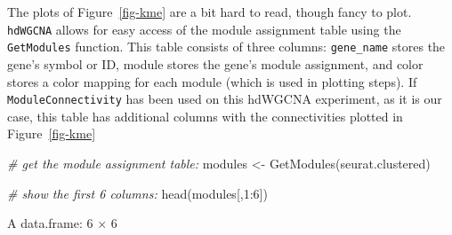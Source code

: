 \documentclass[
  letterpaper,
  DIV=11,
  numbers=noendperiod]{scrartcl}
\newenvironment{Shaded}{}{}
\newcommand{\CommentTok}[1]{\textcolor[rgb]{0.38,0.63,0.69}{\textit{#1}}}
\newcommand{\DecValTok}[1]{\textcolor[rgb]{0.25,0.63,0.44}{#1}}
\newcommand{\FunctionTok}[1]{\textcolor[rgb]{0.02,0.16,0.49}{#1}}
\newcommand{\NormalTok}[1]{#1}
\newcommand{\OtherTok}[1]{\textcolor[rgb]{0.00,0.44,0.13}{#1}}
\newcommand{\SpecialCharTok}[1]{\textcolor[rgb]{0.25,0.44,0.63}{#1}}
\begin{document}
The plots of Figure~\ref{fig-kme} are a bit hard to read, though fancy
to plot. \texttt{hdWGCNA} allows for easy access of the module
assignment table using the \texttt{GetModules} function. This table
consists of three columns: \texttt{gene\_name} stores the gene's symbol
or ID, module stores the gene's module assignment, and color stores a
color mapping for each module (which is used in plotting steps). If
\texttt{ModuleConnectivity} has been used on this hdWGCNA experiment, as
it is our case, this table has additional columns with the
connectivities plotted in Figure~\ref{fig-kme}

\begin{Shaded}
\begin{Highlighting}[]
\CommentTok{\# get the module assignment table:}
\NormalTok{modules }\OtherTok{\textless{}{-}} \FunctionTok{GetModules}\NormalTok{(seurat.clustered)}

\CommentTok{\# show the first 6 columns:}
\FunctionTok{head}\NormalTok{(modules[,}\DecValTok{1}\SpecialCharTok{:}\DecValTok{6}\NormalTok{])}
\end{Highlighting}
\end{Shaded}

A data.frame: 6 × 6
\end{document}
